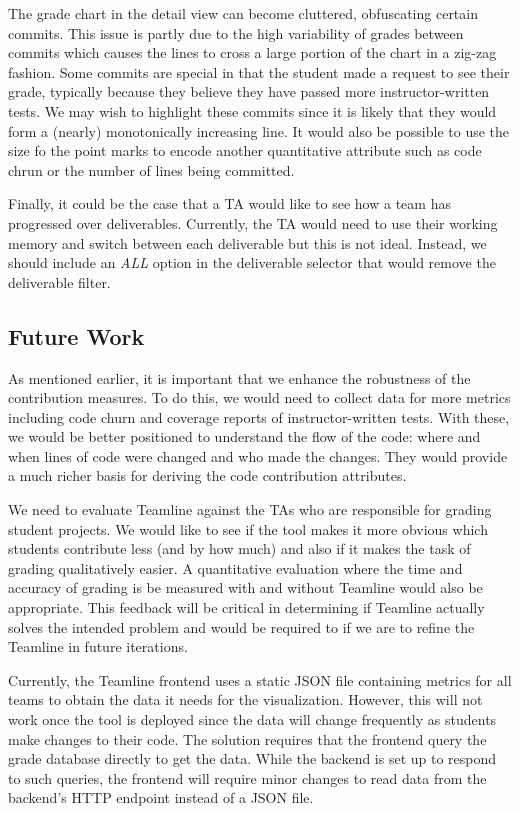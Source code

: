 \documentclass[../manifest.tex]{subfiles}
\begin{document}
The grade chart in the detail view can become cluttered, obfuscating certain commits. This issue is partly due to the high variability of grades between commits which causes the lines to cross a large portion of the chart in a zig-zag fashion. Some commits are special in that the student made a request to see their grade, typically because they believe they have passed more instructor-written tests. We may wish to highlight these commits since it is likely that they would form a (nearly) monotonically increasing line. It would also be possible to use the size fo the point marks to encode another quantitative attribute such as code chrun or the number of lines being committed.

Finally, it could be the case that a TA would like to see how a team has progressed over deliverables. Currently, the TA would need to use their working memory and switch between each deliverable but this is not ideal. Instead, we should include an \textit{ALL} option in the deliverable selector that would remove the deliverable filter.


\subsection{Future Work}
As mentioned earlier, it is important that we enhance the robustness of the contribution measures. To do this, we would need to collect data for more metrics including code churn and coverage reports of instructor-written tests. With these, we would be better positioned to understand the flow of the code: where and when lines of code were changed and who made the changes. They would provide a much richer basis for deriving the code contribution attributes.

We need to evaluate Teamline against the TAs who are responsible for grading student projects. We would like to see if the tool makes it more obvious which students contribute less (and by how much) and also if it makes the task of grading qualitatively easier. A quantitative evaluation where the time and accuracy of grading is be measured with and without Teamline would also be appropriate. This feedback will be critical in determining if Teamline actually solves the intended problem and would be required to if we are to refine the Teamline in future iterations.

Currently, the Teamline frontend uses a static JSON file containing metrics for all teams to obtain the data it needs for the visualization. However, this will not work once the tool is deployed since the data will change frequently as students make changes to their code. The solution requires that the frontend query the grade database directly to get the data. While the backend is set up to respond to such queries, the frontend will require minor changes to read data from the backend's HTTP endpoint instead of a JSON file.
\end{document}
